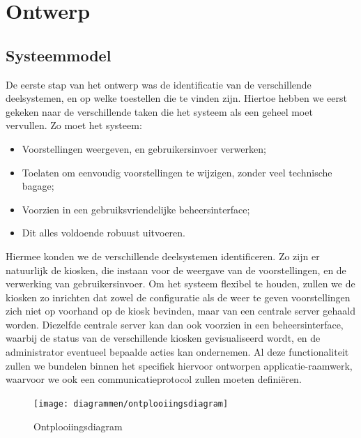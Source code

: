 \documentclass[verslag.tex]{subfiles}
\begin{document}
\part{Ontwerp}
\label{ontwerp}

%
%

\chapter{Systeemmodel}
\label{ontwerp:systeemmodel}

De eerste stap van het ontwerp was de identificatie van de verschillende deelsystemen, en op welke toestellen die te vinden zijn. Hiertoe hebben we eerst gekeken naar de verschillende taken die het systeem als een geheel moet vervullen. Zo moet het systeem:
\begin{itemize}
\item Voorstellingen weergeven, en gebruikersinvoer verwerken;
\item Toelaten om eenvoudig voorstellingen te wijzigen, zonder veel technische bagage;
\item Voorzien in een gebruiksvriendelijke beheersinterface;
\item Dit alles voldoende robuust uitvoeren.
\end{itemize}

Hiermee konden we de verschillende deelsystemen identificeren. Zo zijn er natuurlijk de kiosken, die instaan voor de weergave van de voorstellingen, en de verwerking van gebruikersinvoer. Om het systeem flexibel te houden, zullen we de kiosken zo inrichten dat zowel de configuratie als de weer te geven voorstellingen zich niet op voorhand op de kiosk bevinden, maar van een centrale server gehaald worden. Diezelfde centrale server kan dan ook voorzien in een beheersinterface, waarbij de status van de verschillende kiosken gevisualiseerd wordt, en de administrator eventueel bepaalde acties kan ondernemen. Al deze functionaliteit zullen we bundelen binnen het specifiek hiervoor ontworpen applicatie-raamwerk, waarvoor we ook een communicatieprotocol zullen moeten definiëren.

\begin{figure}
	\texttt{[image: diagrammen/ontplooiingsdiagram]}
	\caption{Ontplooiingsdiagram}
\end{figure}
\end{document}
